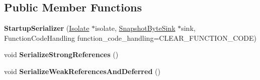 \subsection*{Public Member Functions}
\begin{DoxyCompactItemize}
\item 
{\bfseries Startup\+Serializer} (\hyperlink{classv8_1_1internal_1_1_isolate}{Isolate} $\ast$isolate, \hyperlink{classv8_1_1internal_1_1_snapshot_byte_sink}{Snapshot\+Byte\+Sink} $\ast$sink, Function\+Code\+Handling function\+\_\+code\+\_\+handling=C\+L\+E\+A\+R\+\_\+\+F\+U\+N\+C\+T\+I\+O\+N\+\_\+\+C\+O\+DE)\hypertarget{classv8_1_1internal_1_1_startup_serializer_a90519b450f46629c6725101b42f1913b}{}\label{classv8_1_1internal_1_1_startup_serializer_a90519b450f46629c6725101b42f1913b}

\item 
void {\bfseries Serialize\+Strong\+References} ()\hypertarget{classv8_1_1internal_1_1_startup_serializer_a17aeff9b7703a64fd9287770445ad20f}{}\label{classv8_1_1internal_1_1_startup_serializer_a17aeff9b7703a64fd9287770445ad20f}

\item 
void {\bfseries Serialize\+Weak\+References\+And\+Deferred} ()\hypertarget{classv8_1_1internal_1_1_startup_serializer_a886cd4481da7b23b4febb6f0304ef0ea}{}\label{classv8_1_1internal_1_1_startup_serializer_a886cd4481da7b23b4febb6f0304ef0ea}

\end{DoxyCompactItemize}
